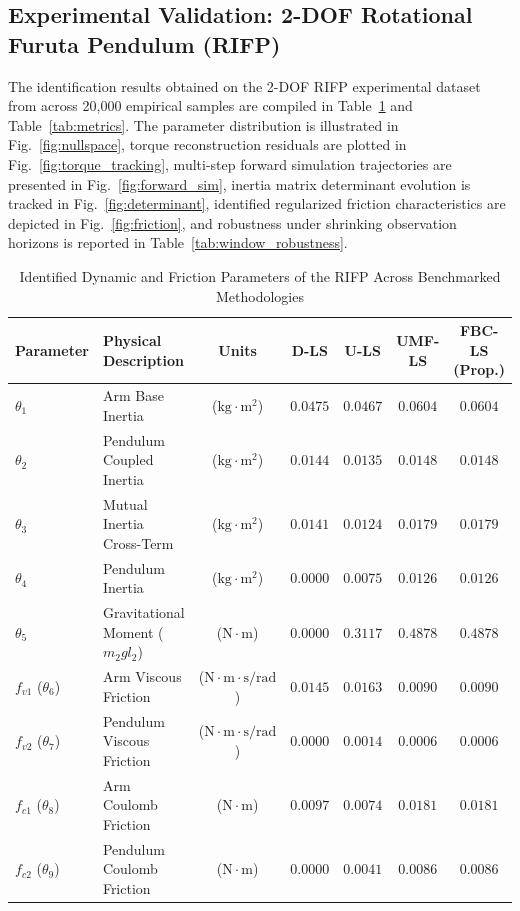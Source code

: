 \documentclass[lettersize,journal]{IEEEtran}
\begin{document}
\subsection{Experimental Validation: 2-DOF Rotational Furuta Pendulum (RIFP)}
\label{sec:results_rifp}
The identification results obtained on the 2-DOF RIFP experimental dataset from \cite{AguilarSierra2014} across 20,000 empirical samples are compiled in Table~\ref{tab:parameters} and Table~\ref{tab:metrics}. The parameter distribution is illustrated in Fig.~\ref{fig:nullspace}, torque reconstruction residuals are plotted in Fig.~\ref{fig:torque_tracking}, multi-step forward simulation trajectories are presented in Fig.~\ref{fig:forward_sim}, inertia matrix determinant evolution is tracked in Fig.~\ref{fig:determinant}, identified regularized friction characteristics are depicted in Fig.~\ref{fig:friction}, and robustness under shrinking observation horizons is reported in Table~\ref{tab:window_robustness}.

\begin{table}[t]
\centering
\caption{Identified Dynamic and Friction Parameters of the RIFP Across Benchmarked Methodologies}
\label{tab:parameters}
\begin{tabular}{llccccc}
\toprule
\textbf{Parameter} & \textbf{Physical Description} & \textbf{Units} & \textbf{D-LS} & \textbf{U-LS} & \textbf{UMF-LS \cite{AguilarSierra2014}} & \textbf{FBC-LS (Prop.)} \\
\midrule
$\theta_1$ & Arm Base Inertia & ($\mathrm{kg\cdot m^2}$) & $0.0475$ & $0.0467$ & $0.0604$ & $\mathbf{0.0604}$ \\
$\theta_2$ & Pendulum Coupled Inertia & ($\mathrm{kg\cdot m^2}$) & $0.0144$ & $0.0135$ & $0.0148$ & $\mathbf{0.0148}$ \\
$\theta_3$ & Mutual Inertia Cross-Term & ($\mathrm{kg\cdot m^2}$) & $0.0141$ & $0.0124$ & $0.0179$ & $\mathbf{0.0179}$ \\
$\theta_4$ & Pendulum Inertia & ($\mathrm{kg\cdot m^2}$) & $0.0000$ & $0.0075$ & $0.0126$ & $\mathbf{0.0126}$ \\
$\theta_5$ & Gravitational Moment ($m_2 g l_2$) & ($\mathrm{N\cdot m}$) & $0.0000$ & $0.3117$ & $0.4878$ & $\mathbf{0.4878}$ \\
$f_{v1}$ ($\theta_6$) & Arm Viscous Friction & ($\mathrm{N\cdot m\cdot s/rad}$) & $0.0145$ & $0.0163$ & $0.0090$ & $\mathbf{0.0090}$ \\
$f_{v2}$ ($\theta_7$) & Pendulum Viscous Friction & ($\mathrm{N\cdot m\cdot s/rad}$) & $0.0000$ & $0.0014$ & $0.0006$ & $\mathbf{0.0006}$ \\
$f_{c1}$ ($\theta_8$) & Arm Coulomb Friction & ($\mathrm{N\cdot m}$) & $0.0097$ & $0.0074$ & $0.0181$ & $\mathbf{0.0181}$ \\
$f_{c2}$ ($\theta_9$) & Pendulum Coulomb Friction & ($\mathrm{N\cdot m}$) & $0.0000$ & $0.0041$ & $0.0086$ & $\mathbf{0.0086}$ \\
\bottomrule
\end{tabular}
\end{table}
\end{document}
